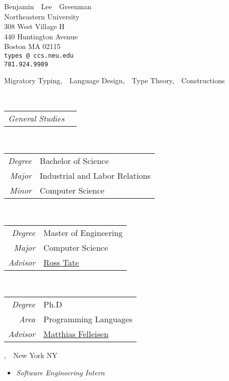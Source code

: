 \documentclass{article}
\makeatletter
\renewcommand{\maketitle}{
\begin{center}
  {\large{Benjamin~~Lee~~Greenman}}
\vspace{0.1cm}
\\Northeastern University
\\308 West Village H
\\440 Huntington Avenue
\\Boston MA 02115
\\\texttt{types\,@\,ccs.neu.edu}
\\\texttt{781.924.9989}
\end{center}
}
\makeatother
\begin{document}
\maketitle



Migratory Typing,~~Language Design,~~Type Theory,~~Constructions


 \hfill {}\\
\begin{tabular}{>{\it}r l}
General Studies & \\
\end{tabular}

 \hfill {}\\
\begin{tabular}{>{\it}r l}
Degree & Bachelor of Science\\
Major & Industrial and Labor Relations\\
Minor & Computer Science\\
\end{tabular}

 \hfill {}\\
\begin{tabular}{>{\it}r l}
Degree & Master of Engineering\\
Major & Computer Science\\
Advisor & \href{http://www.cs.cornell.edu/~ross/}{Ross Tate}
\end{tabular}

 \hfill {}\\
\begin{tabular}{>{\it}r l}
Degree & Ph.D \\
Area & Programming Languages \\
Advisor & \href{http://ccs.neu.edu/home/matthias}{Matthias Felleisen}
\end{tabular}



,~~New York NY
\begin{itemize}
  \item \emph{Software Engineering Intern} \hfill {}
\end{itemize}
\end{document}

